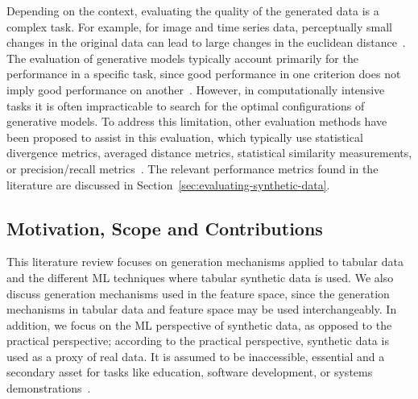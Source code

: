 \documentclass[parskip=full]{scrartcl}
\begin{document}
Depending on the context, evaluating the quality of the generated data is a
complex task. For example, for image and time series data, perceptually small
changes in the original data can lead to large changes in the euclidean
distance~\cite{assefa2020generating, theis2016note}. The evaluation of
generative models typically account primarily for the performance in a
specific task, since good performance in one criterion does not imply good
performance on another~\cite{theis2016note}. However, in computationally
intensive tasks it is often impracticable to search for the optimal
configurations of generative models. To address this limitation, other
evaluation methods have been proposed to assist in this evaluation, which
typically use statistical divergence metrics, averaged distance metrics,
statistical similarity measurements, or precision/recall
metrics~\cite{chundawat2022tabsyndex, alaa2022faithful}. The relevant
performance metrics found in the literature are discussed in
Section~\ref{sec:evaluating-synthetic-data}.

\subsection{Motivation, Scope and Contributions}


This literature review focuses on generation mechanisms applied to tabular
data and the different ML techniques where tabular synthetic data is used.  We
also discuss generation mechanisms used in the feature space, since the
generation mechanisms in tabular data and feature space may be used
interchangeably. In addition, we focus on the ML perspective of synthetic
data, as opposed to the practical perspective; according to the practical
perspective, synthetic data is used as a proxy of real data. It is assumed to
be inaccessible, essential and a secondary asset for tasks like education,
software development, or systems demonstrations~\cite{mannino2019real}. 
\end{document}
